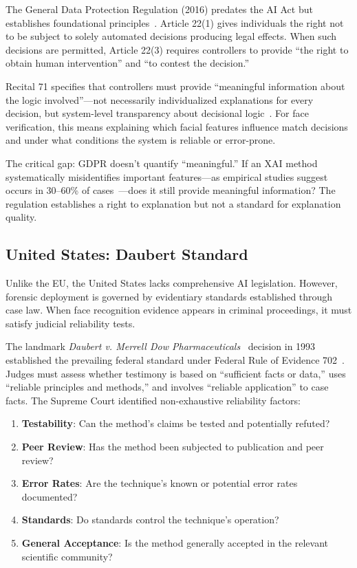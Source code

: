 The General Data Protection Regulation (2016) predates the AI Act but establishes foundational principles~\cite{gdpr2016}. Article 22(1) gives individuals the right not to be subject to solely automated decisions producing legal effects. When such decisions are permitted, Article 22(3) requires controllers to provide ``the right to obtain human intervention'' and ``to contest the decision.''

Recital 71 specifies that controllers must provide ``meaningful information about the logic involved''—not necessarily individualized explanations for every decision, but system-level transparency about decisional logic~\cite{kaminski2019right}. For face verification, this means explaining which facial features influence match decisions and under what conditions the system is reliable or error-prone.

The critical gap: GDPR doesn't quantify ``meaningful.'' If an XAI method systematically misidentifies important features—as empirical studies suggest occurs in 30--60\% of cases~\cite{adebayo2018sanity,kindermans2019reliability}—does it still provide meaningful information? The regulation establishes a right to explanation but not a standard for explanation quality.

\subsection{United States: Daubert Standard}

Unlike the EU, the United States lacks comprehensive AI legislation. However, forensic deployment is governed by evidentiary standards established through case law. When face recognition evidence appears in criminal proceedings, it must satisfy judicial reliability tests.

The landmark \emph{Daubert v. Merrell Dow Pharmaceuticals}~\cite{daubert1993} decision in 1993 established the prevailing federal standard under Federal Rule of Evidence 702~\cite{fre702}. Judges must assess whether testimony is based on ``sufficient facts or data,'' uses ``reliable principles and methods,'' and involves ``reliable application'' to case facts. The Supreme Court identified non-exhaustive reliability factors:

\begin{enumerate}[itemsep=2pt]
    \item \textbf{Testability}: Can the method's claims be tested and potentially refuted?
    \item \textbf{Peer Review}: Has the method been subjected to publication and peer review?
    \item \textbf{Error Rates}: Are the technique's known or potential error rates documented?
    \item \textbf{Standards}: Do standards control the technique's operation?
    \item \textbf{General Acceptance}: Is the method generally accepted in the relevant scientific community?
\end{enumerate}

